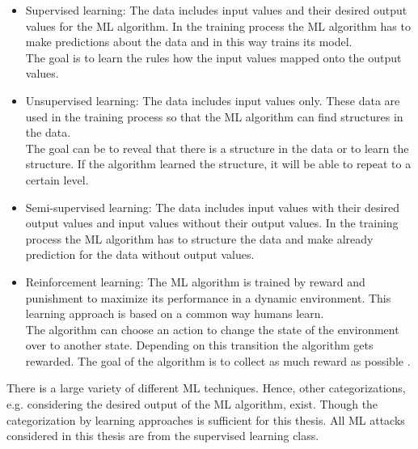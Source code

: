 \begin{itemize}
\item Supervised learning: The data includes input values and their desired output values for the \ac{ML} algorithm. 
In the training process the \ac{ML} algorithm has to make predictions about the data and in this way trains its model.\\
The goal is to learn the rules how the input values mapped onto the output values.
\item Unsupervised learning: The data includes input values only.
These data are used in the training process so that the \ac{ML} algorithm can find structures in the data.\\
The goal can be to reveal that there is a structure in the data or to learn the structure.
If the algorithm learned the structure, it will be able to repeat to a certain level.
\item Semi-supervised learning: The data includes input values with their desired output values and input values without their output values. %
In the training process the \ac{ML} algorithm has to structure the data and make already prediction for the data without output values.
\item Reinforcement learning: The \ac{ML} algorithm is trained by reward and punishment to maximize its performance in a dynamic environment.
This learning approach is based on a common way humans learn.\\
The algorithm can choose an action to change the state of the environment over to another state.
Depending on this transition the algorithm gets rewarded.
The goal of the algorithm is to collect as much reward as possible \cite{2017ReinforcementLearning}.
\end{itemize}

There is a large variety of different \ac{ML} techniques.
Hence, other categorizations, e.g. considering the desired output of the \ac{ML} algorithm, exist.
Though the categorization by learning approaches is sufficient for this thesis.
All \ac{ML} attacks considered in this thesis are from the supervised learning class.







